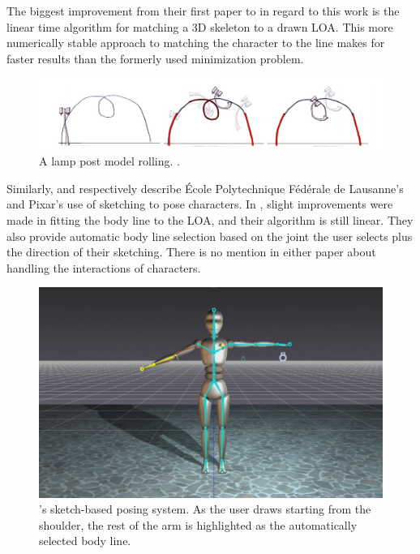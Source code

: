 The biggest improvement from their first paper to \citep{guay2015space} in regard to this work is the linear time algorithm for matching a 3D skeleton to a drawn LOA. This more numerically stable approach to matching the character to the line makes for faster results than the formerly used minimization problem.

\begin{figure}[!h]
\includegraphics[scale=0.4]{img/rolling}
\caption{A lamp post model rolling. \citep{guay2015space}.}
\end{figure}

Similarly, \citep{mahmudi2016artist} and \citep{stelzleni2015sketch} respectively describe \'Ecole Polytechnique F\'ed\'erale de Lausanne's and Pixar's use of sketching to pose characters. In \citep{mahmudi2016artist}, slight improvements were made in fitting the body line to the LOA, and their algorithm is still linear. They also provide automatic body line selection based on the joint the user selects plus the direction of their sketching. There is no mention in either paper about handling the interactions of characters. 

\begin{figure}[!h]
\centering
\includegraphics[scale=0.3]{img/epfl}
\caption{ \citep{mahmudi2016artist}'s sketch-based posing system. As the user draws starting from the shoulder, the rest of the arm is highlighted as the automatically selected body line.}
\end{figure}

